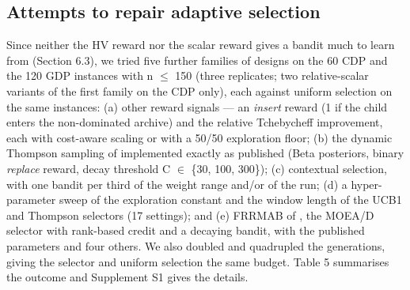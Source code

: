 \subsection{Attempts to repair adaptive selection}\label{sec:attempts_to_repair_adaptive_}

Since neither the HV reward nor the scalar reward gives a bandit much to learn from (Section 6.3), we tried five further families of designs on the 60 CDP and the 120 GDP instances with n $\leq$ 150 (three replicates; two relative-scalar variants of the first family on the CDP only), each against uniform selection on the same instances: (a) other reward signals --- an \emph{insert} reward (1 if the child enters the non-dominated archive) and the relative Tchebycheff improvement, each with cost-aware scaling or with a 50/50 exploration floor; (b) the dynamic Thompson sampling of \citet{sun2020} implemented exactly as published (Beta posteriors, binary \emph{replace} reward, decay threshold C $\in$ \{30, 100, 300\}); (c) contextual selection, with one bandit per third of the weight range and/or of the run; (d) a hyper-parameter sweep of the exploration constant and the window length of the UCB1 and Thompson selectors (17 settings); and (e) FRRMAB of \citet{li2014}, the MOEA/D selector with rank-based credit and a decaying bandit, with the published parameters and four others. We also doubled and quadrupled the generations, giving the selector and uniform selection the same budget. Table 5 summarises the outcome and Supplement S1 gives the details.

